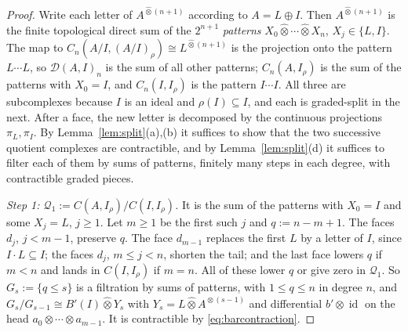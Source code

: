 \documentclass[11pt]{amsart}
\theoremstyle{definition}
\theoremstyle{remark}
\newcommand{\id}{\operatorname{id}}
\begin{document}
\begin{proof}
Write each letter of $A^{\widehat\otimes(n+1)}$ according to $A=L\oplus I$.
Then $A^{\widehat\otimes(n+1)}$ is the finite topological direct sum of the
$2^{n+1}$ \emph{patterns} $X_0\widehat\otimes\cdots\widehat\otimes X_n$,
$X_j\in\{L,I\}$.  The map to $C_n(A/I,(A/I)_{\rho})\cong L^{\widehat\otimes(n+1)}$
is the projection onto the pattern $L\cdots L$, so $\mathcal D(A,I)_n$ is the
sum of all other patterns; $C_n(A,I_{\rho})$ is the sum of the patterns with
$X_0=I$, and $C_n(I,I_{\rho})$ is the pattern $I\cdots I$.  All three are
subcomplexes because $I$ is an ideal and $\rho(I)\subseteq I$, and each is
graded-split in the next.  After a face, the new letter is decomposed by the
continuous projections $\pi_L,\pi_I$.  By Lemma~\ref{lem:split}(a),(b) it
suffices to show that the two successive quotient complexes are contractible,
and by
Lemma~\ref{lem:split}(d) it suffices to filter each of them by sums of
patterns, finitely many steps in each degree, with contractible graded pieces.

\emph{Step 1: $\mathcal Q_1:=C(A,I_{\rho})/C(I,I_{\rho})$.}  It is the sum of
the patterns with $X_0=I$ and some $X_j=L$, $j\ge1$.  Let $m\ge1$ be the first
such $j$ and $q:=n-m+1$.  The faces $d_j$, $j<m-1$, preserve $q$.  The face
$d_{m-1}$ replaces the first $L$ by a letter of $I$, since $I\cdot L\subseteq
I$; the faces $d_j$, $m\le j<n$, shorten the tail; and the last face lowers $q$
if $m<n$ and lands in $C(I,I_{\rho})$ if $m=n$.  All of these lower $q$ or
give zero in $\mathcal Q_1$.  So $G_s:=\{q\le s\}$ is a filtration by sums of
patterns, with $1\le q\le n$ in degree $n$, and $G_s/G_{s-1}\cong
B'(I)\widehat\otimes Y_s$ with $Y_s=L\widehat\otimes A^{\widehat\otimes(s-1)}$
and differential $b'\otimes\id$ on the head $a_0\otimes\cdots\otimes a_{m-1}$.
It is contractible by \eqref{eq:barcontraction}.


\end{proof}
\end{document}
